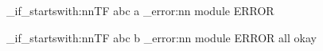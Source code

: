 \documentclass[12pt]{article}
\begin{document}
\ExplSyntaxOn
\str_if_startswith:nnTF {abc} {a}
{
}
{
	\msg_error:nn {module} {ERROR}
}

\str_if_startswith:nnTF {abc} {b}
{
	\msg_error:nn {module} {ERROR}
}
{
}
\ExplSyntaxOff
all okay
\end{document}
